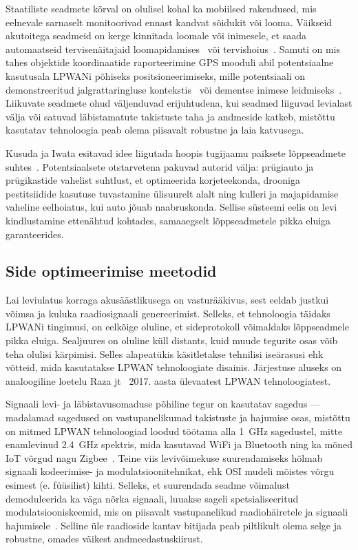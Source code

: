 \documentclass[12pt]{article}
\begin{document}
Staatiliste seadmete kõrval on olulisel kohal ka mobiilsed rakendused, mis eelnevale sarnaselt monitoorivad ennast kandvat sõidukit või looma.
Väikseid akutoitega seadmeid on kerge kinnitada loomale või inimesele, et saada automaatseid tervisenäitajaid loomapidamises~\cite{germani, liliu} või tervishoius~\cite{olatinwo, petajajarvi}.
Samuti on mis tahes objektide koordinaatide raporteerimine GPS mooduli abil potentsiaalne kasutusala LPWANi põhiseks positsioneerimiseks, mille potentsiaali on demonstreeritud jalgrattaringluse kontekstis~\cite{kimpark} või dementse inimese leidmiseks~\cite{hadwen}.
Liikuvate seadmete ohud väljenduvad erijuhtudena, kui seadmed liiguvad levialast välja või satuvad läbistamatute takistuste taha ja andmeside katkeb, mistõttu kasutatav tehnoloogia peab olema piisavalt robustne ja laia katvusega.

Kusuda ja Iwata esitavad idee liigutada hoopis tugijaamu paiksete lõppseadmete suhtes~\cite{kusuda}.
Potentsiaalsete otstarvetena pakuvad autorid välja: prügiauto ja prügikastide vahelist suhtlust, et optimeerida korjeteekonda, drooniga pestitsiidide kasutuse tuvastamine ülisuurelt alalt ning kulleri ja majapidamise vaheline eelhoiatus, kui auto jõuab naabruskonda.
Sellise süsteemi eelis on levi kindlustamine ettenähtud kohtades, samaaegselt lõppseadmetele pikka eluiga garanteerides.

\subsection{Side optimeerimise meetodid}

Lai leviulatus korraga akusäästlikusega on vasturääkivus, sest eeldab justkui võimsa ja kuluka raadiosignaali genereerimist.
Selleks, et tehnoloogia täidaks LPWANi tingimusi, on eelkõige oluline, et sideprotokoll võimaldaks lõppseadmele pikka eluiga.
Sealjuures on oluline küll distants, kuid muude tegurite osas võib teha olulisi kärpimisi.
Selles alapeatükis käsitletakse tehnilisi iseärasusi ehk võtteid, mida kasutatakse LPWAN tehnoloogiate disainis.
Järjestuse aluseks on analoogiline loetelu Raza jt~\cite{raza} 2017. aasta ülevaatest LPWAN tehnoloogiatest.

Signaali levi- ja läbistavusomaduse põhiline tegur on kasutatav sagedus — madalamad sagedused on vastupanelikumad takistuste ja hajumise osas, mistõttu on mitmed LPWAN tehnoloogiad loodud töötama alla \SI{1}{\giga\hertz} sagedustel, mitte enamlevinud \SI{2,4}{\giga\hertz} spektris, mida kasutavad WiFi ja Bluetooth ning ka mõned IoT võrgud nagu Zigbee~\cite{bardyn}.
Teine viis levivõimekuse suurendamiseks hõlmab signaali kodeerimise- ja modulatsioonitehnikat, ehk OSI mudeli mõistes võrgu esimest (e. füüsilist) kihti. Selleks, et suurendada seadme võimalust demoduleerida ka väga nõrka signaali, luuakse sageli spetsialiseeritud modulatsiooniskeemid, mis on piisavalt vastupanelikud raadiohäiretele ja signaali hajumisele~\cite{reynders}.
Selline üle raadioside kantav bitijada peab piltlikult olema selge ja robustne, omades väikest andmeedastuskiirust.
\end{document}
